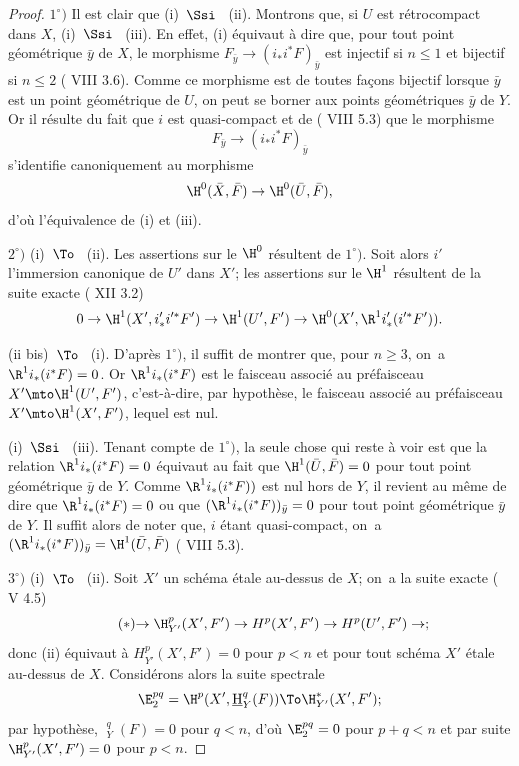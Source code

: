 \skpt
\begin{proof}
$1^\circ)$ Il est clair que \textup{(i)}~$\Ssi$~ \textup{(ii)}.
Montrons que, si $U$ est r\'etrocompact dans $X$, \textup{(i)}~$\Ssi$~
\textup{(iii)}. En effet, \textup{(i)} \'equivaut \`a dire que, pour
tout point g\'eom\'etrique $\bar{y}$ de $X$, le morphisme
$F_{\bar{y}}\to (i_*i^*F)_{\bar{y}}$ est injectif si $n\leq 1$ et
bijectif si $n\leq 2$ ( VIII 3.6). Comme ce morphisme est de
toutes fa\c cons bijectif lorsque $\bar{y}$ est un point
g\'eom\'etrique de $U$, on peut se borner aux points g\'eom\'etriques
$\bar{y}$ de $Y$. Or il r\'esulte du fait que $i$ est quasi-compact
et de ( VIII 5.3) que le morphisme
$$F_{\bar{y}}\to (i_*i^*F)_{\bar{y}}$$
s'identifie canoniquement au morphisme
$$
\H^0(\bar{X}, \bar{F})\to \H^0(\bar{U}, \bar{F}),
$$
d'o\`u l'\'equivalence de \textup{(i)} et \textup{(iii)}.

$2^\circ)$ \textup{(i)}~$\To$~ \textup{(ii)}. Les assertions sur le $\H^0$ r\'esultent de $1^\circ)$. Soit alors $i'$ l'immersion canonique de $U'$ dans $X'$; les assertions sur le $\H^1$ r\'esultent de la suite exacte ( XII 3.2)
$$0\to \H^1(X', i'_*i'^*F')\to \H^1(U', F')\to \H^0(X', \R^1i'_*(i'^*F')).
$$

(ii bis)~$\To$~ \textup{(i)}. D'apr\`es $1^\circ)$, il suffit de montrer que, pour $n\geq 3$, on~a $\R^1i_*(i^*F)=0$. Or $\R^1i_*(i^*F)$ est le faisceau associ\'e au pr\'efaisceau $X'\mto \H^1(U', F')$, c'est-\`a-dire, par hypoth\`ese, le faisceau associ\'e au pr\'efaisceau $X'\mto \H^1(X', F')$, lequel est nul.

\textup{(i)}~$\Ssi$~ \textup{(iii)}. Tenant compte de $1^\circ)$, la seule chose qui reste \`a voir est que la relation $\R^1i_*(i^*F)=0$ \'equivaut au fait que $\H^1(\bar U, \bar F)=0$ pour tout point g\'eom\'etrique $\bar y$ de $Y$. Comme $\R^1i_*(i^*F))$ est nul hors de $Y$, il revient au m\^eme de dire que $\R^1i_*(i^*F)=0$ ou que $(\R^1i_*(i^*F))_{\bar y}=0$ pour tout point g\'eom\'etrique $\bar y$ de $Y$. Il suffit alors de noter que, $i$ \'etant quasi-compact, on~a $(\R^1i_*(i^*F))_{\bar y}=\H^1(\bar U, \bar F)$ ( VIII 5.3).

$3^\circ)$ \textup{(i)}~$\To$~ \textup{(ii)}. Soit $X'$ un sch\'ema \'etale au-dessus de $X$; on~a la suite exacte ( V 4.5)
\begin{equation*} \label{eq:XIV.1.1.*} \tag{$*$} {\to \H^p_{Y'}(X', F')\to H^p(X', F')\to H^p(U', F')\to};
\end{equation*}
donc \textup{(ii)} \'equivaut \`a $H^p_{Y'}(X', F')=0$ pour $p<n$ et pour tout sch\'ema $X'$ \'etale au-dessus de $X$. Consid\'erons alors la suite spectrale
$$
\E_2^{pq}=\H^p(X', {\mathop{\underline{\mathrm{H}}}\nolimits}_Y^q(F))\To \H_{Y'}^*(X', F');$$
par hypoth\`ese, ${\mathop{\underline{\mathrm{H}}}\nolimits}_Y^q(F)=0$ pour $q<n$, d'o\`u $\E_2^{pq}=0$ pour $p+q<n$ et par suite $\H_{Y'}^p(X', F')=0$ pour $p<n$.


\end{proof}

